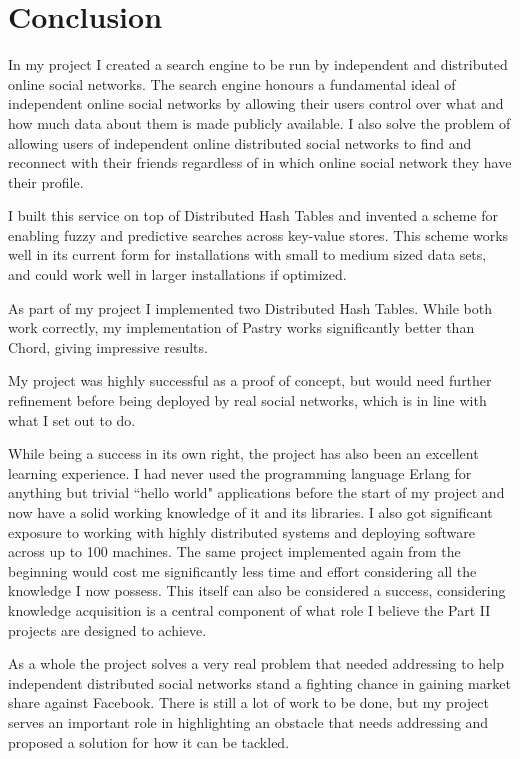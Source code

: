 

\chapter{Conclusion}
In my project I created a search engine to be run by independent and distributed online social networks. The search engine honours a fundamental ideal of independent online social networks by allowing their users control over what and how much data about them is made publicly available. I also solve the problem of allowing users of independent online distributed social networks to find and reconnect with their friends regardless of in which online social network they have their profile.

I built this service on top of Distributed Hash Tables and invented a scheme for enabling fuzzy and predictive searches across key-value stores. This scheme works well in its current form for installations with small to medium sized data sets, and could work well in larger installations if optimized.

As part of my project I implemented two Distributed Hash Tables. While both work correctly, my implementation of Pastry works significantly better than Chord, giving impressive results.

My project was highly successful as a proof of concept, but would need further refinement before being deployed by real social networks, which is in line with what I set out to do. 

\mbox{}

While being a success in its own right, the project has also been an excellent learning experience.
I had never used the programming language Erlang for anything but trivial ``hello world" applications before the start of my project and now have a solid working knowledge of it and its libraries. I also got significant exposure to working with highly distributed systems and deploying software across up to 100 machines.
The same project implemented again from the beginning would cost me significantly less time and effort considering all the knowledge I now possess. This itself can also be considered a success, considering knowledge acquisition is a central component of what role I believe the Part II projects are designed to achieve.

\mbox{}

As a whole the project solves a very real problem that needed addressing to help independent distributed social networks stand a fighting chance in gaining market share against Facebook. There is still a lot of work to be done, but my project serves an important role in highlighting an obstacle that needs addressing and proposed a solution for how it can be tackled.
